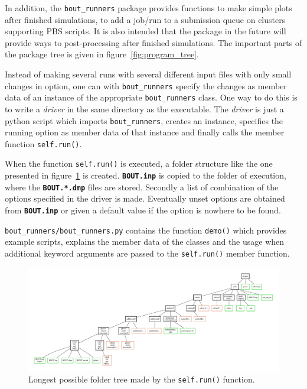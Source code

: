 \documentclass[12pt]{article}
\newcommand{\file}[1]{\texttt{\bf #1}}
\begin{document}
In addition, the \lstinline!bout_runners! package provides functions to make
simple plots after finished simulations, to add a job/run to a submission queue
on clusters supporting PBS scripts. It is also intended that the package in the
future will provide ways to post-processing after finished simulations. The
important parts of the package tree is given in figure~\ref{fig:program_tree}.


Instead of making several runs with several different input files with only
small changes in option, one can with \lstinline!bout_runners! specify the
changes as member data of an instance of the appropriate
\lstinline!bout_runners! class. One way to do this is to write a \emph{driver}
in the same directory as the executable. The \emph{driver} is just a
python script which imports
\lstinline!bout_runners!, creates an instance, specifies the
running option as member data of that instance and finally calls the
member function \lstinline!self.run()!.

When the function \lstinline!self.run()! is executed, a folder structure like
the one presented in figure~\ref{fig:folder_tree} is created.
\file{BOUT.inp} is copied to the folder of execution, where the
\file{BOUT.*.dmp} files are stored. Secondly a list of combination of the
options specified in the driver is made. Eventually unset options are obtained
from \file{BOUT.inp} or given a default value if the option is nowhere to be
found.

\lstinline!bout_runners/bout_runners.py! contains the function
\lstinline!demo()! which provides example scripts, explains the member data of
the classes and the usage when additional keyword arguments are passed to the
\lstinline!self.run()! member function.

\begin{landscape}
\thispagestyle{empty}
 \vspace*{2cm}
 \begin{figure}[htbp!]
 \hspace*{-4cm}
\centering
\includegraphics[width=1.35\hsize]{figs/folder_tree.pdf}
\caption{Longest possible folder tree made by the \lstinline!self.run()!
function.}
\label{fig:folder_tree}
\end{figure}
\end{landscape}
\end{document}
